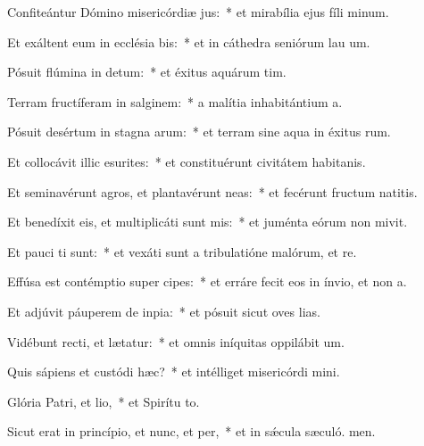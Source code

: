 \item Confiteántur Dómino misericórdiæ jus:~* et mirabília ejus fíli minum.
\item Et exáltent eum in ecclésia bis:~* et in cáthedra seniórum lau um.
\item Pósuit flúmina in detum:~* et éxitus aquárum  tim.
\item Terram fructíferam in salginem:~* a malítia inhabitántium  a.
\item Pósuit desértum in stagna arum:~* et terram sine aqua in éxitus rum.
\item Et collocávit illic esurites:~* et constituérunt civitátem habitanis.
\item Et seminavérunt agros, et plantavérunt neas:~* et fecérunt fructum natitis.
\item Et benedíxit eis, et multiplicáti sunt mis:~* et juménta eórum non mivit.
\item Et pauci ti sunt:~* et vexáti sunt a tribulatióne malórum, et re.
\item Effúsa est contémptio super cipes:~* et erráre fecit eos in ínvio, et non  a.
\item Et adjúvit páuperem de inpia:~* et pósuit sicut oves lias.
\item Vidébunt recti, et lætatur:~* et omnis iníquitas oppilábit  um.
\item Quis sápiens et custódi hæc?~* et intélliget misericórdi mini.
\item Glória Patri, et lio,~* et Spirítu to.
\item Sicut erat in princípio, et nunc, et per,~* et in sǽcula sæculó. men.
